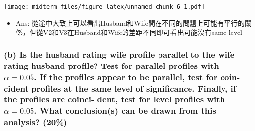 \documentclass[]{article}
\providecommand{\tightlist}{%
  \setlength{\itemsep}{0pt}\setlength{\parskip}{0pt}}
\begin{document}
\texttt{[image: midterm\_files/figure-latex/unnamed-chunk-6-1.pdf]}

\begin{itemize}
\tightlist
\item
  Ans:
  從途中大致上可以看出Husband和Wife間在不同的問題上可能有平行的關係，但從V2和V3在Husband和Wife的差距不同即可看出可能沒有same
  level
\end{itemize}

\hypertarget{b-is-the-husband-rating-wife-profile-parallel-to-the-wife-rating-husband-profile-test-for-parallel-profiles-with-alpha-0.05.-if-the-profiles-appear-to-be-parallel-test-for-coin--cident-profiles-at-the-same-level-of-significance.-finally-if-the-profiles-are-coinci--dent-test-for-level-profiles-with-alpha-0.05.-what-conclusions-can-be-drawn-from-this-analysis-20}{%
\subsubsection{\texorpdfstring{(b) Is the husband rating wife profile
parallel to the wife rating husband profile? Test for parallel profiles
with \(\alpha = 0.05\). If the profiles appear to be parallel, test for
coin- cident profiles at the same level of significance. Finally, if the
profiles are coinci- dent, test for level profiles with
\(\alpha = 0.05\). What conclusion(s) can be drawn from this analysis?
(20\%)}{(b) Is the husband rating wife profile parallel to the wife rating husband profile? Test for parallel profiles with \textbackslash{}alpha = 0.05. If the profiles appear to be parallel, test for coin- cident profiles at the same level of significance. Finally, if the profiles are coinci- dent, test for level profiles with \textbackslash{}alpha = 0.05. What conclusion(s) can be drawn from this analysis? (20\%)}}\label{b-is-the-husband-rating-wife-profile-parallel-to-the-wife-rating-husband-profile-test-for-parallel-profiles-with-alpha-0.05.-if-the-profiles-appear-to-be-parallel-test-for-coin--cident-profiles-at-the-same-level-of-significance.-finally-if-the-profiles-are-coinci--dent-test-for-level-profiles-with-alpha-0.05.-what-conclusions-can-be-drawn-from-this-analysis-20}}
\end{document}
